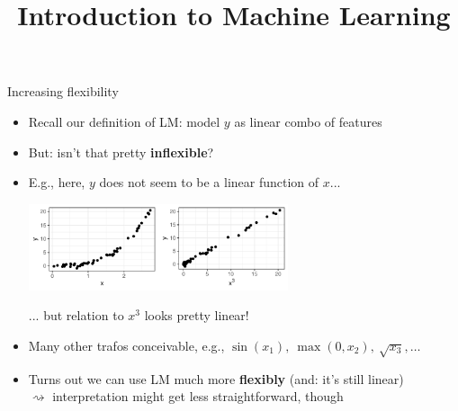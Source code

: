 \documentclass[11pt,compress,t,notes=noshow, xcolor=table]{beamer}
\title{Introduction to Machine Learning}
\institute{\href{https://compstat-lmu.github.io/lecture_i2ml/}{compstat-lmu.github.io/lecture\_i2ml}}
\date{}
\begin{document}


\begin{vbframe}{Increasing flexibility}

\begin{itemize}
    \item Recall our definition of LM: model $y$ as linear combo of features
    \item But: isn't that pretty \textbf{inflexible}?
    \item E.g., here, $y$ does not seem to be a linear function of $x$...

    \vspace{0.5cm}
    \begin{center}
        \includegraphics[width=0.6\textwidth]{figure/reg_poly_yx3.pdf}
    \end{center}

    ... but relation to $x^3$ looks pretty linear!

    \item Many other trafos conceivable, e.g.,
    $\sin(x_1), ~ \max(0, x_2), ~ \sqrt{x_3}, \dots$
    \item Turns out we can use LM much more
    \textbf{flexibly} (and: it's still linear) \\
    $\rightsquigarrow$ interpretation might get less straightforward, though
\end{itemize}

\end{vbframe}

\end{document}
